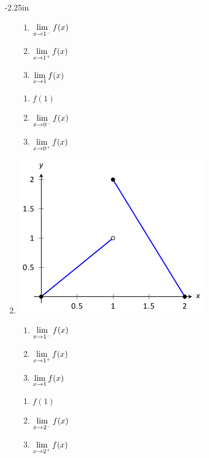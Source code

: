 \begin{adjustwidth*}{}{-2.25in}
\begin{multicols*}{2}
\begin{enumerate}[1),resume]
\noindent\begin{minipage}[t]{.5\linewidth}
\begin{enumerate}
\item		$\displaystyle \lim_{x\to 1^-} f(x)$
\item		$\displaystyle \lim_{x\to 1^+} f(x)$
\item		$\displaystyle \lim_{x\to 1} f(x)$
\end{enumerate}
\end{minipage}
\noindent\begin{minipage}[t]{.5\linewidth}
\begin{enumerate}\addtocounter{enumii}{3}
\item		$f(1)$
\item		$\displaystyle \lim_{x\to 0^-} f(x)$
\item		$\displaystyle \lim_{x\to 0^+} f(x)$
\end{enumerate}
\end{minipage}

\item
\begin{minipage}{\linewidth}\centering
\includegraphics[scale=.8]{figures/fig01_04_ex_06}
\end{minipage}

\noindent\begin{minipage}[t]{.5\linewidth}
\begin{enumerate}
\item		$\displaystyle \lim_{x\to 1^-} f(x)$
\item		$\displaystyle \lim_{x\to 1^+} f(x)$
\item		$\displaystyle \lim_{x\to 1} f(x)$
\end{enumerate}
\end{minipage}
\noindent\begin{minipage}[t]{.5\linewidth}
\begin{enumerate}\addtocounter{enumii}{3}
\item		$f(1)$
\item		$\displaystyle \lim_{x\to 2^-} f(x)$
\item		$\displaystyle \lim_{x\to 2^+} f(x)$
\end{enumerate}
\end{minipage}


\end{enumerate}
\end{multicols*}
\end{adjustwidth*}
